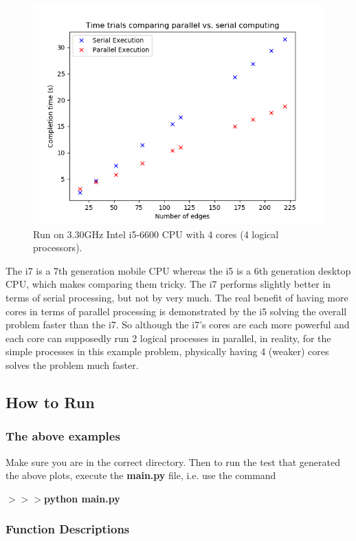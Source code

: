 \documentclass[12pt]{article}
\begin{document}
\begin{figure}[H]
	\includegraphics[scale=1]{Problem3-4cores.png}
	\caption{Run on 3.30GHz Intel i5-6600 CPU with 4 cores (4 logical processors).}
\end{figure}

The i7 is a 7th generation mobile CPU whereas the i5 is a 6th generation desktop CPU, which makes comparing them tricky. The i7 performs slightly better in terms of serial processing, but not by very much. The real benefit of having more cores in terms of parallel processing is demonstrated by the i5 solving the overall problem faster than the i7. So although the i7's cores are each more powerful and each core can supposedly run 2 logical processes in parallel, in reality, for the simple processes in this example problem, physically having 4 (weaker) cores solves the problem much faster.


\subsection*{How to Run}

\subsubsection*{The above examples}

Make sure you are in the correct directory. Then to run the test that generated the above plots, execute the \textbf{main.py} file, i.e. use the command

\noindent \textbf{$>>>$python main.py}

\subsubsection*{Function Descriptions}
\end{document}
